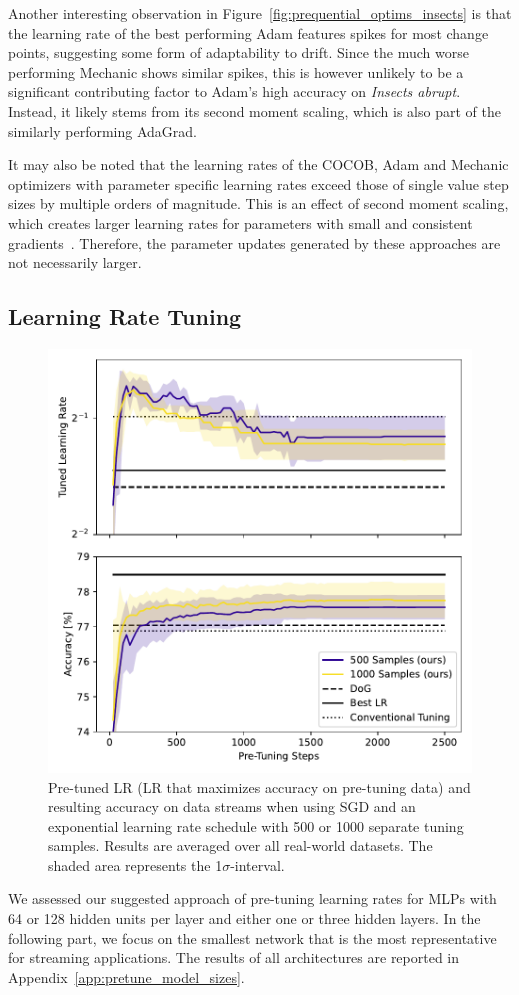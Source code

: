 \documentclass[runningheads]{llncs}
\begin{document}
Another interesting observation in Figure~\ref{fig:prequential_optims_insects} is that the learning rate of the best performing Adam features spikes for most change points, suggesting some form of adaptability to drift.
Since the much worse performing Mechanic shows similar spikes, this is however unlikely to be a significant contributing factor to Adam's high accuracy on \textit{Insects abrupt}.
Instead, it likely stems from its second moment scaling, which is also part of the similarly performing AdaGrad.

It may also be noted that the learning rates of the COCOB, Adam and Mechanic optimizers with parameter specific learning rates exceed those of single value step sizes by multiple orders of magnitude.
This is an effect of second moment scaling, which creates larger learning rates for parameters with small and consistent gradients~\cite{cutkoskyMechanicLearningRate2023}.
Therefore, the parameter updates generated by these approaches are not necessarily larger.

\subsection{Learning Rate Tuning}

\begin{figure}[ht]
	\centering
	\includegraphics[width=.45\textwidth]{figures/pretune_1x64_acc_lr_exp_schedule.pdf}
	\caption{Pre-tuned LR (LR that maximizes accuracy on pre-tuning data) and resulting accuracy on data streams when using SGD and an exponential learning rate schedule with 500 or 1000 separate tuning samples. Results are averaged over all real-world datasets. The shaded area represents the 1$\sigma$-interval.}\label{fig:pretune_lr_accuracy}
\end{figure}

We assessed our suggested approach of pre-tuning learning rates for MLPs with 64 or 128 hidden units per layer and either one or three hidden layers.
In the following part, we focus on the smallest network that is the most representative for streaming applications.
The results of all architectures are reported in Appendix~\ref{app:pretune_model_sizes}.
\end{document}
